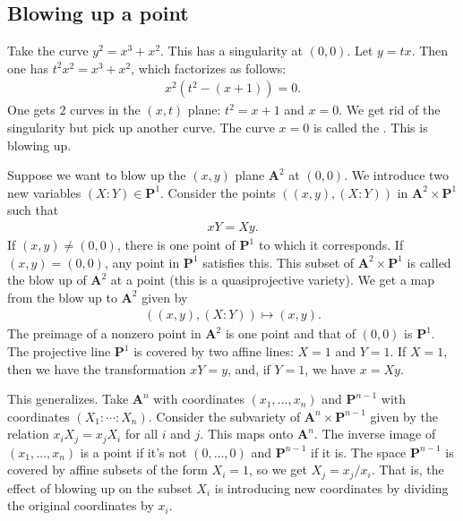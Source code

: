 \documentclass [11 pt, oneside, margin = 1 in] {article}
\begin{document}
\subsection{Blowing up a point}
\begin{example}[ ]\label{}\text{}
Take the curve $y^2 = x^3 +x^2$. This has a singularity at $(0,0)$. Let $y=tx$. Then one has $t^2x^2 = x^3+x^2$, which factorizes as follows:
\begin{align*}
x^2(t^2 - (x+1)) =0.
\end{align*}
One gets $2$ curves in the $(x,t)$ plane: $t^2=x+1$ and $x=0$. We get rid of the singularity but pick up another curve. The curve $x=0$ is called the . This is blowing up.
\end{example}


Suppose we want to blow up the $(x,y)$ plane $\mathbf{A}^2$ at $(0,0)$. We introduce two new variables $(X:Y)\in  \mathbf{P}^1$. Consider the points $((x,y),  (X:Y))$ in $\mathbf{A}^2\times \mathbf{P}^1$ such that 
\begin{align*}
	xY = Xy.
\end{align*}
If $(x,y)\ne (0,0)$, there is one point of $\mathbf{P}^1$ to which it corresponds. If $(x,y)= (0,0)$, any point in $\mathbf{P}^1$ satisfies this. This subset of $\mathbf{A}^2\times \mathbf{P}^1$ is called the blow up of $\mathbf{A}^2$ at a point (this is a quasiprojective variety). We get a map from the blow up to $\mathbf{A}^2$ given by
\begin{align*}
	((x,y), (X:Y)) \longmapsto (x,y).
\end{align*}
The preimage of a nonzero point in $\mathbf{A}^2$ is one point and that of $(0,0)$ is $\mathbf{P}^1$. The projective line $\mathbf{P}^1$ is covered by two affine lines: $X = 1$ and $Y=1$. If $X=1$, then we have the transformation $xY=y$, and, if $Y=1$, we have $x = Xy$.

This generalizes. Take $\mathbf{A}^n$ with coordinates $(x_1,\hdots, x_n)$ and $\mathbf{P}^{n-1}$ with coordinates $(X_1:\cdots : X_n)$. Consider the subvariety of $\mathbf{A}^n\times \mathbf{P}^{n-1}$ given by the relation $x_iX_j = x_jX_i$ for all $i$ and $j$. This maps onto $\mathbf{A}^n$. The inverse image of $(x_1,\hdots, x_n)$ is a point if it's not $(0,\hdots, 0)$ and $\mathbf{P}^{n-1}$ if it is. The space $\mathbf{P}^{n-1}$ is covered by affine subsets of the form $X_i=1$, so we get $X_j = x_j/x_i$. That is, the effect of blowing up on the subset $X_i$ is introducing new coordinates by dividing the original coordinates by $x_i$.
\end{document}
